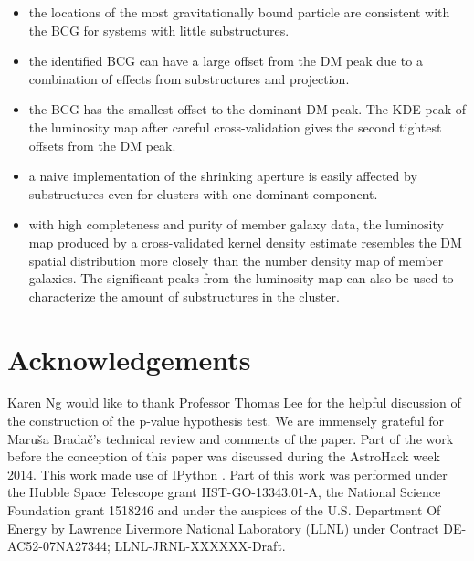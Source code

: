 \begin{itemize}
		\item the locations of the most gravitationally bound particle are consistent 
			with the BCG for systems with little substructures.  \\

		\item the identified BCG can have a large offset from the DM peak due to a
			combination of effects from substructures and projection. \\

		\item the BCG has the smallest offset to the dominant DM peak.  
			The KDE peak of the luminosity map after careful cross-validation 
			gives the second tightest offsets from the DM peak.  \\
		
		\item a naive implementation of the shrinking aperture is easily affected 
			by substructures even for clusters with one
			dominant component. \\  

		\item with high completeness and purity of member galaxy data, the
			luminosity map produced by a cross-validated kernel density estimate 
			resembles the DM spatial distribution more closely than 
			the number density map of member galaxies. The significant peaks from the 
			luminosity map can also be used to characterize the amount of substructures in
			the cluster.\\ 

	
\end{itemize}


\section{Acknowledgements}
Karen Ng would like to thank Professor Thomas Lee for the helpful discussion of 
the construction of the p-value hypothesis test. We are immensely grateful for 
Maru\v{s}a Brada\v{c}'s technical review and comments of the paper.  
Part of the work before the conception of this paper was discussed during 
the AstroHack week 2014. This work made use of {\sc IPython}
\citep{Perez2007}.
Part of this work was performed under the Hubble Space Telescope grant
HST-GO-13343.01-A, the National Science Foundation grant 
1518246 and under the auspices of the U.S. Department Of Energy by 
Lawrence Livermore National Laboratory (LLNL) 
under Contract DE-AC52-07NA27344; 
LLNL-JRNL-XXXXXX-Draft.
% 
% 
% 
% 
% 
% 
% 

